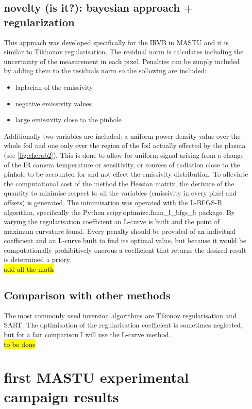 \subsection{novelty (is it?): bayesian approach + regularization}
This approach was developed specifically for the IRVB in MASTU and it is similar to Tikhonov regularisation. The residual norm is calculates including the uncertainty of the measurement in each pixel. Penalties can be simply included by adding them to the residuals norm so the sollowing are included:
\begin{itemize}
\item laplacian of the emissivity
\item negative emissivity values
\item large emissivity close to the pinhole
\end{itemize}
Additionally two variables are included: a uniform power density value over the whole foil and one only over the region of the foil actually effected by the plasma (see \autoref{fig:cherab2}). This is done to allow for uniform signal arising from a change of the IR camera temperature or sensitivity, or sources of radiation close to the pinhole to be accounted for and not effect the emissivity distribution.
To alleviate the computational cost of the method the Hessian matrix, the derivate of the quantity to minimise respect to all the variables (emissivity in every pixel and offsets) is generated. The minimisation was operated with the L-BFGS-B algorithm, specifically the Python scipy.optimize.fmin\_l\_bfgs\_b package. \cite{Morales2011}
By varying the regularisation coefficient an L-curve is built and the point of maximum curvature found.
Every penalty should be provided of an indivitual coefficient and an L-curve built to find its optimal value, but because it would be computationally prohibitively onerous a coefficient that returns the desired result is determined a priory.\\
\hl{add all the math}
\subsection{Comparison with other methods}
The most commonly used inversion algorithms are Tikonov regularisation and SART. The optimisation of the regularisation coefficient is sometimes neglected, but for a fair comparison I will use the L-curve method.\\
\hl{to be done}

\section{first MASTU experimental campaign results}
